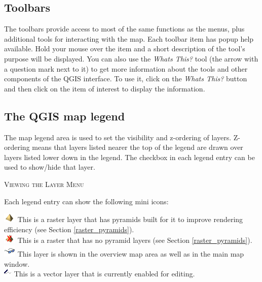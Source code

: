 \subsection{Toolbars}
The toolbars provide access to most of the same functions as the menus, plus
additional tools for interacting with the map. Each toolbar item has popup
help available. Hold your mouse over the item and a short description of the
tool's purpose will be displayed. You can also use the \textit{Whats This?}
tool (the arrow with a question mark next to it) to get more information about
the tools and other components of the QGIS interface. To use it, click on the
\textit{Whats This?} button and then click on the item of interest to display
the information. %

\subsection{The QGIS map legend}
The map legend area is used to set the visibility and z-ordering of layers.
Z-ordering means that layers listed nearer the top of the legend are drawn
over layers listed lower down in the legend. The checkbox in each legend entry
can be used to show/hide that layer.
\begin{Tip} \caption{\textsc{Viewing the Layer Menu}}
\end{Tip}

Each legend entry can show the following mini icons:

\includegraphics[scale=1]{qgis_user_guide_images/pyramid} This is a raster
layer that has pyramids built for it to improve rendering efficiency (see
Section \ref{raster_pyramids}).\\
\includegraphics[scale=1]{qgis_user_guide_images/no_pyramid} This is a raster
that has no pyramid layers (see Section \ref{raster_pyramids}).\\
\includegraphics[scale=1]{qgis_user_guide_images/inoverview} This layer is
shown in the overview map area as well as in the main map window.\\
\includegraphics[scale=1]{qgis_user_guide_images/editable} This is a vector
layer that is currently enabled for editing.\\

